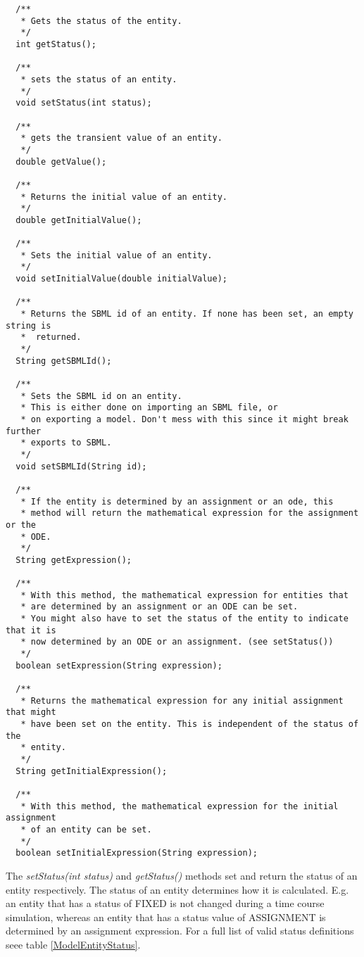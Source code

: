 \documentclass[a4,12pt]{article}
\begin{document}
\begin{lstlisting}
  /**
   * Gets the status of the entity.
   */
  int getStatus();

  /**
   * sets the status of an entity.
   */
  void setStatus(int status);

  /**
   * gets the transient value of an entity.
   */
  double getValue();

  /**
   * Returns the initial value of an entity.
   */
  double getInitialValue();

  /**
   * Sets the initial value of an entity.
   */
  void setInitialValue(double initialValue);

  /**
   * Returns the SBML id of an entity. If none has been set, an empty string is
   *  returned.
   */
  String getSBMLId();

  /**
   * Sets the SBML id on an entity.
   * This is either done on importing an SBML file, or
   * on exporting a model. Don't mess with this since it might break further
   * exports to SBML.
   */
  void setSBMLId(String id);

  /**
   * If the entity is determined by an assignment or an ode, this
   * method will return the mathematical expression for the assignment or the
   * ODE.
   */
  String getExpression();

  /**
   * With this method, the mathematical expression for entities that
   * are determined by an assignment or an ODE can be set.
   * You might also have to set the status of the entity to indicate that it is
   * now determined by an ODE or an assignment. (see setStatus())
   */
  boolean setExpression(String expression);

  /**
   * Returns the mathematical expression for any initial assignment that might
   * have been set on the entity. This is independent of the status of the
   * entity.
   */
  String getInitialExpression();

  /**
   * With this method, the mathematical expression for the initial assignment
   * of an entity can be set.
   */
  boolean setInitialExpression(String expression);
\end{lstlisting}

The \textit{setStatus(int status)} and \textit{getStatus()} methods set and return the status of an entity respectively. The status of an entity determines how it is calculated. E.g. an entity that has a status of FIXED is not changed during a time course simulation, whereas an entity that has a status value of ASSIGNMENT is determined by an assignment expression. For a full list of valid status definitions seee table \ref{ModelEntityStatus}.
\end{document}
